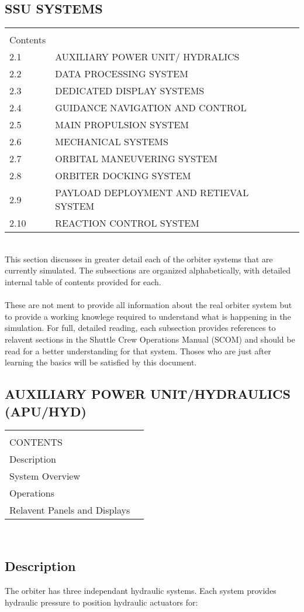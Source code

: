 \documentclass[Space_Shuttle_Ultra_Manual.tex]{subfiles}
\begin{document}
\begin{multicols}{2}

\section{\large SSU SYSTEMS}

\begin{tabular}{| p{0.3cm}  p{6.7cm}  p{0.25cm}|}
	\hline
	 & & \\[0.1cm]
	Contents & & \\[0.4cm]
	2.1 & AUXILIARY POWER UNIT/ HYDRALICS & \\
	2.2 & DATA PROCESSING SYSTEM & \\
	2.3 & DEDICATED DISPLAY SYSTEMS & \\
	2.4 & GUIDANCE NAVIGATION AND CONTROL & \\
	2.5 & MAIN PROPULSION SYSTEM & \\
	2.6 & MECHANICAL SYSTEMS & \\
	2.7 & ORBITAL MANEUVERING SYSTEM & \\
	2.8 & ORBITER DOCKING SYSTEM & \\
	2.9 & PAYLOAD DEPLOYMENT AND RETIEVAL SYSTEM & \\
	2.10 & REACTION CONTROL SYSTEM & \\
	\hline
\end{tabular}
\\[0.4cm]
This section discusses in greater detail each of the orbiter systems that are currently simulated. The subsections are organized alphabetically, with detailed internal table of contents provided for each.\\
\\
These are not ment to provide all information about the real orbiter system but to provide a working knowlege required to understand what is happening in the simulation. For full, detailed reading, each subsection provides references to relavent sections in the Shuttle Crew Operations Manual (SCOM) and should be read for a better understanding for that system.  Thoses who are just after learning the basics will be satisfied by this document.

\newpage
\subsection{\large AUXILIARY POWER UNIT/HYDRAULICS (APU/HYD)}

\begin{tabular}{|p{6.9cm} p{0.25cm}|}
	\hline
	&\\[0.1cm]
	CONTENTS & \\[0.4cm]
	Description &\\
	System Overview & \\
	Operations & \\
	Relavent Panels and Displays &  \\
	\hline
\end{tabular}
\\[0.4cm]
\subsection*{Description}
The orbiter has three independant hydraulic systems. Each system provides hydraulic pressure to position hydraulic actuators for:
	

\end{multicols}
\end{document}
